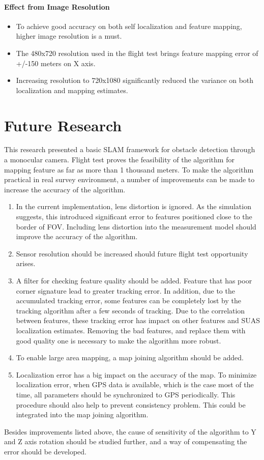 \paragraph{Effect from Image Resolution}
\begin{itemize}
  \item To achieve good accuracy on both self localization and
  feature mapping, higher image resolution is a must. 
  \item The 480x720 resolution used in the flight test brings feature
  mapping error of +/-150 meters on X axis.
  \item Increasing resolution to 720x1080 significantly reduced the
  variance on both localization and mapping estimates. 
\end{itemize}

\section{Future Research}
This research presented a basic SLAM framework for obstacle detection
through a monocular camera. Flight test proves the feasibility of the
algorithm for mapping feature as far as more than 1 thousand meters.
To make the algorithm practical in real survey environment, a number
of improvements can be made to increase the accuracy of the algorithm.
\begin{enumerate}
  \item In the current implementation, lens distortion is ignored. As
  the simulation suggests, this introduced significant error to
  features positioned close to the border of FOV. Including lens
  distortion into the measurement model should improve the accuracy of
  the algorithm.
  \item Sensor resolution should be increased should future flight
  test opportunity arises. 
  \item A filter for checking feature quality should be added. Feature
  that has poor corner signature lead to greater tracking error. In
  addition, due to the accumulated tracking error, some features can
  be completely lost by the tracking algorithm after a few seconds of
  tracking. Due to the correlation between features, these tracking
  error has impact on other features and SUAS localization estimates.
  Removing the bad features, and replace them with good quality one is
  necessary to make the algorithm more robust.
  \item To enable large area mapping, a map joining algorithm should
  be added.
  \item Localization error has a big impact on the accuracy of the
  map. To minimize localization error, when GPS data is available,
  which is the case most of the time, all parameters should be
  synchronized to GPS periodically. This procedure should also help
  to prevent consistency problem. This could be integrated into the
  map joining algorithm.  
\end{enumerate}

Besides improvements listed above, the cause of sensitivity of the
algorithm to Y and Z axis rotation should be studied further, and a
way of compensating the error should be developed. 

